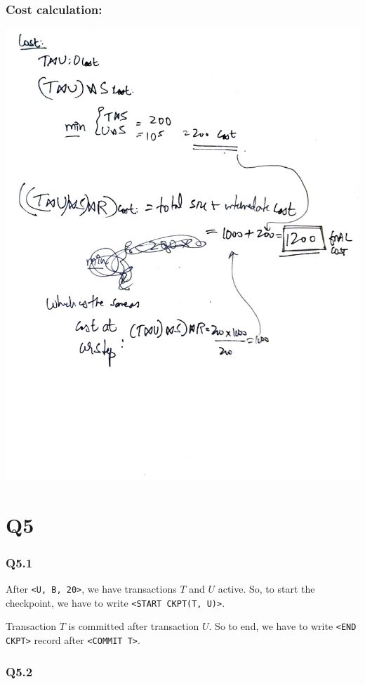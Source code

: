 \documentclass{article}
\begin{document}
\subsubsection{Cost calculation:}
\includegraphics[width=\textwidth]{db-q4-2.pdf}
\section{Q5}

\subsubsection{Q5.1}
After \texttt{<U, B, 20>}, we have transactions $T$ and $U$ active.  So, to start the checkpoint,
we have to write \texttt{<START CKPT(T, U)>}. 

Transaction $T$ is committed after transaction $U$. So to end, we have  to
write \texttt{<END CKPT>} record after \texttt{<COMMIT T>}.

\subsubsection{Q5.2}
\end{document}

